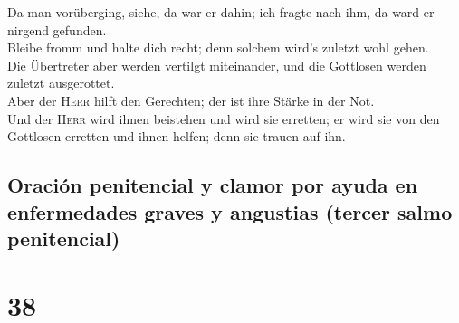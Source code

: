  Da man vorüberging, siehe, da war er dahin; ich fragte
nach ihm, da ward er nirgend gefunden.\\
 Bleibe fromm und halte dich recht; denn solchem wird's
zuletzt wohl gehen.\\
 Die Übertreter aber werden vertilgt miteinander, und die
Gottlosen werden zuletzt ausgerottet.\\
 Aber der \textsc{Herr} hilft den Gerechten; der ist ihre
Stärke in der Not.\\
 Und der \textsc{Herr} wird ihnen beistehen und wird sie
erretten; er wird sie von den Gottlosen erretten und ihnen helfen; denn
sie trauen auf ihn.

\hypertarget{oraciuxf3n-penitencial-y-clamor-por-ayuda-en-enfermedades-graves-y-angustias-tercer-salmo-penitencial}{%
\subsection{Oración penitencial y clamor por ayuda en enfermedades
graves y angustias (tercer salmo
penitencial)}\label{oraciuxf3n-penitencial-y-clamor-por-ayuda-en-enfermedades-graves-y-angustias-tercer-salmo-penitencial}}

\hypertarget{section-37}{%
\section{38}\label{section-37}}

